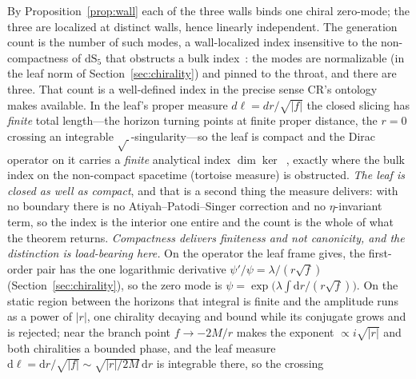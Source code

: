 \documentclass[11pt]{article}
\newcommand{\dd}{\mathrm{d}}
\newcommand{\dS}{\mathrm{dS}}
\begin{document}
By Proposition~\ref{prop:wall} each of the three walls binds one chiral zero-mode; the three are localized at distinct walls, hence linearly independent. The generation count is the number of such modes, a wall-localized index insensitive to the non-compactness of $\dS_5$ that obstructs a bulk index~\cite{JanzenBoundary}: the modes are normalizable (in the leaf norm of Section~\ref{sec:chirality}) and pinned to the throat, and there are three. That count is a well-defined index in the precise sense CR's ontology makes available. In the leaf's proper measure $d\ell=dr/\sqrt{|f|}$ the closed slicing has \emph{finite} total length---the horizon turning points at finite proper distance, the $r=0$ crossing an integrable $\sqrt{\,}$-singularity---so the leaf is compact and the Dirac operator on it carries a \emph{finite} analytical index $\dim\ker$~\cite{AtiyahSinger1968}, exactly where the bulk index on the non-compact spacetime (tortoise measure) is obstructed. \emph{The leaf is closed as well as compact}, and that is a second thing the measure delivers: with no boundary there is no Atiyah--Patodi--Singer correction and no $\eta$-invariant term, so the index is the interior one entire and the count is the whole of what the theorem returns. \emph{Compactness delivers finiteness and not canonicity, and the distinction is load-bearing here.} On the operator the leaf frame gives, the first-order pair has the one logarithmic derivative
$\psi'/\psi=\lambda/(r\sqrt f)$ (Section~\ref{sec:chirality}), so the zero mode is
$\psi=\exp\bigl(\lambda\!\int\!\dd r/(r\sqrt f)\bigr)$. On the static region between the horizons that
integral is finite and the amplitude runs as a power of $\lvert r\rvert$, one chirality decaying and bound while
its conjugate grows and is rejected; near the branch point $f\to-2M/r$ makes the
exponent $\propto i\sqrt{\lvert r\rvert}$ and both chiralities a bounded phase, and the leaf measure
$\dd\ell=\dd r/\sqrt{\lvert f\rvert}\sim\sqrt{\lvert r\rvert/2M}\,\dd r$ is integrable there, so the crossing
\end{document}
